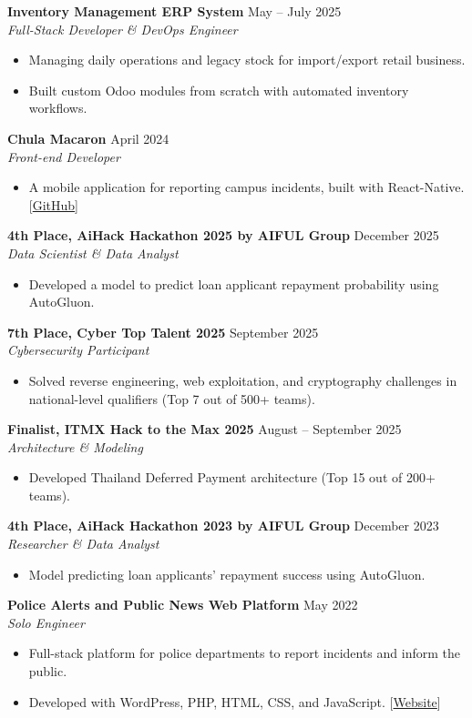 \documentclass[a4paper,10pt]{article}
\newcommand{\project}[3]{
  \vspace{1.2ex}
  \textbf{#1} \hfill #2 \\
  \textit{#3} \par
}
\begin{document}
\project{Inventory Management ERP System}{May -- July 2025}{Full-Stack Developer \& DevOps Engineer}
\begin{itemize}
    \item Managing daily operations and legacy stock for import/export retail business.
    \item Built custom Odoo modules from scratch with automated inventory workflows.
\end{itemize}

\project{Chula Macaron}{April 2024}{Front-end Developer}
\begin{itemize}
    \item A mobile application for reporting campus incidents, built with React-Native. [\href{https://github.com/xXpeira12/ChulaMacaron}{GitHub}]
\end{itemize}

\project{4th Place, AiHack Hackathon 2025 by AIFUL Group}{December 2025}{Data Scientist \& Data Analyst}
\begin{itemize}
    \item Developed a model to predict loan applicant repayment probability using AutoGluon.
\end{itemize}

\project{7th Place, Cyber Top Talent 2025}{September 2025}{Cybersecurity Participant}
\begin{itemize}
    \item Solved reverse engineering, web exploitation, and cryptography challenges in national-level qualifiers (Top 7 out of 500+ teams).
\end{itemize}

\project{Finalist, ITMX Hack to the Max 2025}{August -- September 2025}{Architecture \& Modeling}
\begin{itemize}
    \item Developed Thailand Deferred Payment architecture (Top 15 out of 200+ teams).
\end{itemize}

\project{4th Place, AiHack Hackathon 2023 by AIFUL Group}{December 2023}{Researcher \& Data Analyst}
\begin{itemize}
    \item Model predicting loan applicants' repayment success using AutoGluon.
\end{itemize}

\project{Police Alerts and Public News Web Platform}{May 2022}{Solo Engineer}
\begin{itemize}
    \item Full-stack platform for police departments to report incidents and inform the public.
    \item Developed with WordPress, PHP, HTML, CSS, and JavaScript. [\href{https://donhualor-chonburi-police.com/}{Website}]
\end{itemize}
\end{document}
